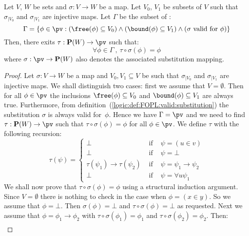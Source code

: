 \begin{theorem}\label{logic:the:FOPL:localinv:main}
Let $V$, $W$ be sets and $\sigma:V\to W$ be a map. Let $V_{0}$,
$V_{1}$ be subsets of $V$ such that $\sigma_{|V_{0}}$ and
$\sigma_{|V_{1}}$ are injective maps. Let $\Gamma$ be the subset of
\pv:
    \[
    \Gamma=\{\phi\in\pv:(\free(\phi)\subseteq
    V_{0})\land(\bound(\phi)\subseteq V_{1})\land(\mbox{$\sigma$
    valid for $\phi$})\}
    \]
Then, there exits $\tau:{\bf P}(W)\to\pv$ such that:
    \[
    \forall\phi\in\Gamma\ ,\ \tau\circ\sigma(\phi)=\phi
    \]
where $\sigma:\pv\to{\bf P}(W)$ also denotes the associated
substitution mapping.
\end{theorem}
\begin{proof}
Let $\sigma:V\to W$ be a map and $V_{0},V_{1}\subseteq V$ be such
that $\sigma_{|V_{0}}$ and $\sigma_{|V_{1}}$ are injective maps. We
shall distinguish two cases: first we assume that $V=\emptyset$.
Then for all $\phi\in\pv$ the inclusions $\free(\phi)\subseteq
V_{0}$ and $\bound(\phi)\subseteq V_{1}$ are always true.
Furthermore, from
definition~(\ref{logic:def:FOPL:valid:substitution}) the
substitution $\sigma$ is always valid for~$\phi$. Hence we have
$\Gamma=\pv$ and we need to find $\tau:{\bf P}(W)\to\pv$ such that
$\tau\circ\sigma(\phi)=\phi$ for all $\phi\in\pv$. We define $\tau$
with the following recursion:
    \begin{equation}\label{logic:eqn:FOPL:localinv:the:1}
                    \tau(\psi)=\left\{
                    \begin{array}{lcl}
                    \bot&\mbox{\ if\ }&\psi=(u\in v)\\
                    \bot&\mbox{\ if\ }&\psi=\bot\\
                    \tau(\psi_{1})\to\tau(\psi_{2})
                    &\mbox{\ if\ }&\psi=\psi_{1}\to\psi_{2}\\
                    \bot&
                    \mbox{\ if\ }&\psi=\forall u\psi_{1}
                    \end{array}\right.
    \end{equation}
We shall now prove that $\tau\circ\sigma(\phi)=\phi$ using a
structural induction argument.  Since $V=\emptyset$ there is nothing
to check in the case when $\phi=(x\in y)$. So we assume that
$\phi=\bot$. Then $\sigma(\phi)=\bot$ and
$\tau\circ\sigma(\phi)=\bot$ as requested. Next we assume that
$\phi=\phi_{1}\to\phi_{2}$ with $\tau\circ\sigma(\phi_{1})=\phi_{1}$
and $\tau\circ\sigma(\phi_{2})=\phi_{2}$. Then:
    \begin{eqnarray*}

\end{eqnarray*}
\end{proof}
